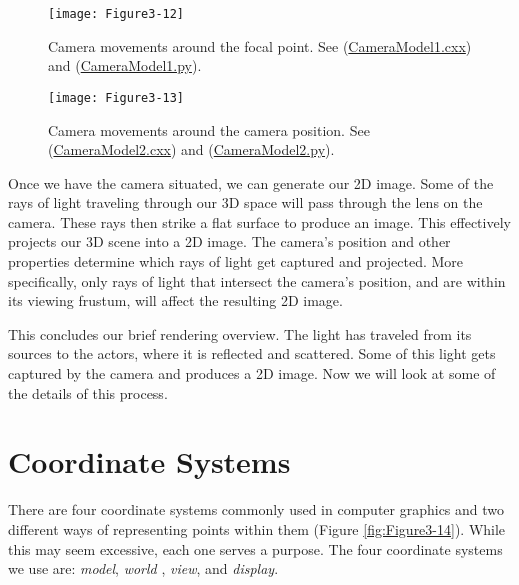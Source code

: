 \begin{figure}[!htb]
  \centering
  \texttt{[image: Figure3-12]}\\
  \caption{Camera movements around the focal point. See (\href{https://lorensen.github.io/VTKExamples/site/Cxx/Visualization/CameraModel1/}{CameraModel1.cxx}) and (\href{https://lorensen.github.io/VTKExamples/site/Python/Visualization/CameraModel1/}{CameraModel1.py}).}\label{fig:Figure3-12}
\end{figure}

\begin{figure}[!htb]
  \centering
  \texttt{[image: Figure3-13]}\\
  \caption{Camera movements around the camera position. See (\href{https://lorensen.github.io/VTKExamples/site/Cxx/Visualization/CameraModel2/}{CameraModel2.cxx}) and (\href{https://lorensen.github.io/VTKExamples/site/Python/Visualization/CameraModel2/}{CameraModel2.py}).}\label{fig:Figure3-13}
\end{figure}

Once we have the camera situated, we can generate our 2D image. Some of the rays of light traveling through our 3D space will pass through the lens on the camera. These rays then strike a flat surface to produce an image. This effectively projects our 3D scene into a 2D image. The camera's position and other properties determine which rays of light get captured and projected. More specifically, only rays of light that intersect the camera's position, and are within its viewing frustum, will affect the resulting 2D image.

This concludes our brief rendering overview. The light has traveled from its sources to the actors, where it is reflected and scattered. Some of this light gets captured by the camera and produces a 2D image. Now we will look at some of the details of this process.

\section{Coordinate Systems}
\label{sec:coordinate_systems}

There are four coordinate systems commonly used in computer graphics and two different ways of representing points within them (Figure \ref{fig:Figure3-14}). While this may seem excessive, each one serves a purpose. The four coordinate systems we use are: \emph{model}, \emph{world} , \emph{view}, and \emph{display}.

